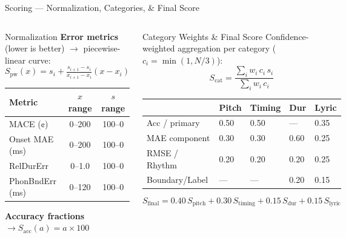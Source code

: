\documentclass[aspectratio=169,9pt]{beamer}
\begin{document}
\begin{frame}{Scoring --- Normalization, Categories, \& Final Score}
  \begin{columns}[T]
      \begin{block}{Normalization}
        \footnotesize
        \textbf{Error metrics} (lower is better) $\to$ piecewise-linear curve:
        \[
          S_\text{pw}(x) = s_i + \tfrac{s_{i+1}-s_i}{x_{i+1}-x_i}(x - x_i)
        \]
        \vspace{-4pt}
        \begin{tabular}{@{}lcc@{}}
          \toprule
          Metric & $x$ range & $s$ range \\
          \midrule
          MACE (¢)       & 0–200 & 100–0 \\
          Onset MAE (ms) & 0–200 & 100–0 \\
          RelDurErr      & 0–1.0 & 100–0 \\
          PhonBndErr (ms)& 0–120 & 100–0 \\
          \bottomrule
        \end{tabular}
        \medskip\par
        \textbf{Accuracy fractions} $\to S_\text{acc}(a)=a\times100$
      \end{block}

      \begin{block}{Category Weights \& Final Score}
        \footnotesize
        Confidence-weighted aggregation per category
        ($c_i = \min(1, N/3)$):
        \[
          S_\text{cat}
            = \frac{\sum_i w_i\,c_i\,s_i}{\sum_i w_i\,c_i}
        \]
        \renewcommand{\arraystretch}{1.1}
        \begin{tabular}{@{}lllll@{}}
          \toprule
          & \textbf{Pitch} & \textbf{Timing} & \textbf{Dur} & \textbf{Lyric} \\
          \midrule
          Acc / primary & 0.50 & 0.50 & — & 0.35 \\
          MAE component & 0.30 & 0.30 & 0.60 & 0.25 \\
          RMSE / Rhythm & 0.20 & 0.20 & 0.20 & 0.25 \\
          Boundary/Label& —    & —    & 0.20 & 0.15 \\
          \bottomrule
        \end{tabular}
        \medskip
        \[
          \boxed{S_\text{final}
            = 0.40\,S_\text{pitch}
            + 0.30\,S_\text{timing}
            + 0.15\,S_\text{dur}
            + 0.15\,S_\text{lyric}}
        \]
      \end{block}
  \end{columns}
\end{frame}
\end{document}

